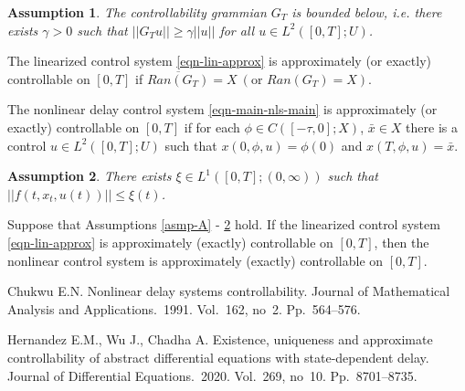\documentclass[12pt]{llncs}
\newtheorem{asmp}{Assumption}
\begin{document}
\begin{asmp}\label{asmp-cg-inv}
The controllability grammian $G_T$ is bounded below, i.e. there exists $\gamma > 0$ such that $||G_T u|| \ge \gamma ||u||$ for all $u \in L^2([0,T];U)$.
\end{asmp}

\begin{definition}
The linearized control system \eqref{eqn-lin-approx} is approximately (or exactly) controllable on $[0,T]$ if $\overline{Ran(G_T)} = X~ (\text{or } Ran(G_T) = X)$.
\end{definition}

\begin{definition}
The nonlinear delay control system \eqref{eqn-main-nls-main} is approximately (or exactly) controllable on $[0,T]$ if for each $\phi \in C([-\tau,0];X)$, $\bar{x} \in X$ there is a control $u \in L^2([0,T];U)$ such that $x(0,\phi,u) = \phi(0)$ and $x(T,\phi,u) = \bar{x}$.
\end{definition}

\begin{asmp}\label{asmp-f-bound}
There exists $\xi \in L^1([0,T];(0,\infty))$ such that $||f(t,x_t,u(t))|| \le \xi(t)$.
\end{asmp}

\begin{theorem}
Suppose that Assumptions \ref{asmp-A} - \ref{asmp-f-bound} hold. If the linearized control system \eqref{eqn-lin-approx} is approximately (exactly) controllable on $[0,T]$, then the nonlinear control system is approximately (exactly) controllable on $[0,T]$.
\end{theorem}



\begin{thebibliography}{9} %

%

Chukwu E.N. Nonlinear delay systems controllability. Journal of Mathematical Analysis and Applications.~1991. Vol.~162, no~2. Pp.~564--576.

Hernandez E.M., Wu J., Chadha A. Existence, uniqueness and approximate controllability of abstract differential equations with state-dependent delay. Journal of Differential Equations.~2020. Vol.~269, no~10. Pp.~8701--8735.

\end{thebibliography}


%
%
%


\end{document}
